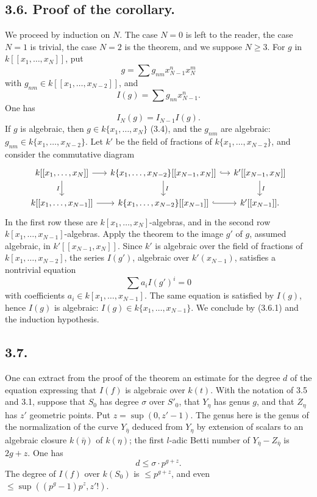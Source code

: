 \documentclass[11pt]{article}
\begin{document}
\subsection*{3.6. Proof of the corollary.}
We proceed by induction on $N$. The case $N=0$ is left to the reader, the case $N=1$ is trivial, the case $N=2$ is the theorem, and we suppose $N\ge3$. For $g$ in $k[[x_1,\ldots,x_N]]$, put
\[
        g=\sum g_{nm}x_{N-1}^n x_N^m
\]
with $g_{nm}\in k[[x_1,\ldots,x_{N-2}]]$, and
\[
        I(g)=\sum g_{nn}x_{N-1}^n.
\]
One has
\begin{equation}
        I_N(g)=I_{N-1}I(g). \tag{3.6.1}
\end{equation}
If $g$ is algebraic, then $g\in k\{x_1,\ldots,x_N\}$ (3.4), and the $g_{nm}$ are algebraic: $g_{nm}\in k\{x_1,\ldots,x_{N-2}\}$. Let $k'$ be the field of fractions of $k\{x_1,\ldots,x_{N-2}\}$, and consider the commutative diagram
\[
\begin{tikzcd}[column sep=small]
k[[x_1,\ldots,x_N]] \arrow[r] \arrow[d,"I"'] & k\{x_1,\ldots,x_{N-2}\}[[x_{N-1},x_N]] \arrow[r,hook] \arrow[d,"I"] & k'[[x_{N-1},x_N]] \arrow[d,"I"] \\
k[[x_1,\ldots,x_{N-1}]] \arrow[r] & k\{x_1,\ldots,x_{N-2}\}[[x_{N-1}]] \arrow[r,hook] & k'[[x_{N-1}]] .
\end{tikzcd}
\]
In the first row these are $k[x_1,\ldots,x_N]$-algebras, and in the second row $k[x_1,\ldots,x_{N-1}]$-algebras. Apply the theorem to the image $g'$ of $g$, assumed algebraic, in $k'[[x_{N-1},x_N]]$. Since $k'$ is algebraic over the field of fractions of $k[x_1,\ldots,x_{N-2}]$, the series $I(g')$, algebraic over $k'(x_{N-1})$, satisfies a nontrivial equation
\[
        \sum a_i I(g')^i=0
\]
with coefficients $a_i\in k[x_1,\ldots,x_{N-1}]$. The same equation is satisfied by $I(g)$, hence $I(g)$ is algebraic: $I(g)\in k\{x_1,\ldots,x_{N-1}\}$. We conclude by (3.6.1) and the induction hypothesis.

\subsection*{3.7.}
One can extract from the proof of the theorem an estimate for the degree $d$ of the equation expressing that $I(f)$ is algebraic over $k(t)$. With the notation of 3.5 and 3.1, suppose that $S_0$ has degree $\sigma$ over $S'_0$, that $Y_\eta$ has genus $g$, and that $Z_\eta$ has $z'$ geometric points. Put $z=\sup(0,z'-1)$. The genus here is the genus of the normalization of the curve $Y_{\bar\eta}$ deduced from $Y_\eta$ by extension of scalars to an algebraic closure $k(\bar\eta)$ of $k(\eta)$; the first $l$-adic Betti number of $Y_{\bar\eta}-Z_{\bar\eta}$ is $2g+z$. One has
\begin{equation}
        d\le \sigma\cdot p^{g+z}. \tag{3.7.1}
\end{equation}
The degree of $I(f)$ over $k(S_0)$ is $\le p^{g+z}$, and even $\le\sup((p^g-1)p^z,z'!)$.
\end{document}
